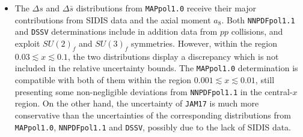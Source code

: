 \begin{itemize}
  \item The $\Delta s$ and $\Delta \bar{s}$ distributions from \texttt{MAPpol1.0} receive their major contributions from SIDIS data and the axial moment $a_8$. Both \texttt{NNPDFpol1.1} and \texttt{DSSV} determinations include in addition data from $pp$ collisions, and exploit $SU(2)_f$ and $SU(3)_f$ symmetries. However, within the region $0.03 \lesssim x \lesssim 0.1$, the two distributions display a discrepancy which is not included in the relative uncertainty bounds. The \texttt{MAPpol1.0} determination is compatible with both of them within the region $0.001 \lesssim x \lesssim 0.01$, still presenting some non-negligible deviations from \texttt{NNPDFpol1.1} in the central-$x$ region. On the other hand, the uncertainty of \texttt{JAM17} is much more conservative than the uncertainties of the corresponding distributions from \texttt{MAPpol1.0}, \texttt{NNPDFpol1.1} and \texttt{DSSV}, possibly due to the lack of SIDIS data.
\end{itemize}

